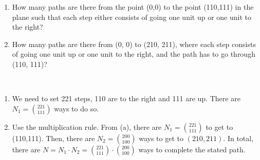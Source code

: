 
\setcounter{theorem}{6}
\begin{exercise}[BH.8]
	\begin{enumerate}
		\item How many paths are there from the point (0,0) to the point (110,111) in the plane such that each step either consists of going one unit up or one unit to the right?
		\item How many paths are there from (0, 0) to (210, 211), where each step consists of going one unit up or one unit to the right, and the path has to go through (110, 111)?
	\end{enumerate}
\begin{solution}~
	\begin{enumerate}
		\item We need to set 221 steps, 110 are to the right and 111 are up. There are $N_{1}={221 \choose 111}$ ways to do so.
		\item Use the multiplication rule. From (a), there are $N_{1}={221 \choose 111}$ to get to (110,111). Then, there are $N_{2}={200 \choose 100}$ ways to get to $(210,211)$. In total, there are $N= N_{1}\cdot N_{2} = {221 \choose 111}\cdot {200 \choose 100}$ ways to complete the stated path.
	\end{enumerate}
\end{solution}
\end{exercise}


